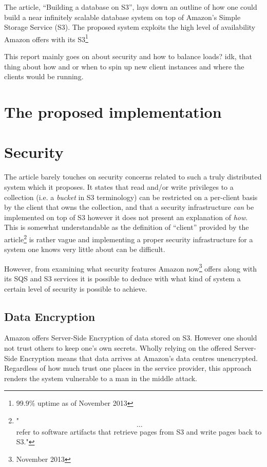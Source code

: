 \documentclass[11pt]{article}
\begin{document}
The article, ``Building a database on S3'', lays down an outline of how one could build a near infinitely scalable database system on top of Amazon's Simple Storage Service (S3).
The proposed system exploits the high level of availability Amazon offers with its S3\footnote{$99.9\%$ uptime as of November 2013}

This report mainly goes on about security and how to balance loads? idk, that thing about how and or when to spin up new client instances and where the clients would be running.

\section{The proposed implementation}


\section{Security}
The article barely touches on security concerns related to such a truly distributed system which it proposes.
It states that read and/or write privileges to a collection (i.e. a \textit{bucket} in S3 terminology) can be restricted on a per-client basis by the client that owns the collection, and that a security infrastructure \textit{can} be implemented on top of S3 however it does not present an explanation of \textit{how}.
This is somewhat understandable as the definition of ``client'' provided by the article\footnote{"\[\dots\] refer to software artifacts that retrieve pages from S3 and write pages back to S3."} is rather vague and implementing a proper security infrastructure for a system one knows very little about can be difficult.

However, from examining what security features Amazon now\footnote{November 2013} offers along with its SQS and S3 services it is possible to deduce with what kind of system a certain level of security is possible to achieve.

\subsection{Data Encryption}
Amazon offers Server-Side Encryption of data stored on S3.
However one should not trust others to keep one's own secrets.
Wholly relying on the offered Server-Side Encryption means that data arrives at Amazon's data centres unencrypted.
Regardless of how much trust one places in the service provider, this approach renders the system vulnerable to a man in the middle attack. 
\end{document}
